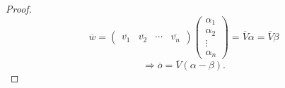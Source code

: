 \documentclass[12pt]{article}
\theoremstyle{definition}
\theoremstyle{definition}
\begin{document}
\begin{proof}
    \[
        \overline{w} = \begin{pmatrix}\overline{v_1} & \overline{v_2} & \cdots & \overline{v_n} \end{pmatrix} \begin{pmatrix} \alpha_1 \\ \alpha_2 \\ \vdots \\ \alpha_n \end{pmatrix} = \overline{V} \alpha = \overline{V} \beta
    \]
    \[
    \Rightarrow \overline{o} = \overline{V} (\alpha - \beta)
    .\] 
\end{proof}
\end{document}
